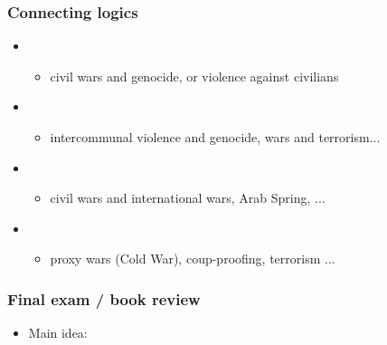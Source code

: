 \documentclass[aspectratio=43]{beamer}
\begin{document}
\begin{frame}
\frametitle{Connecting logics}
\centering

\begin{itemize}
  \item {}
  \begin{itemize}
    \item civil wars and genocide, or violence against civilians
  \end{itemize}
  \item<2-> 
  \begin{itemize}
    \item intercommunal violence and genocide, wars and terrorism...
  \end{itemize}
  \item<3-> 
  \begin{itemize}
    \item civil wars and international wars, Arab Spring, ...
  \end{itemize}
  \item<4-> 
  \begin{itemize}
    \item proxy wars (Cold War), coup-proofing, terrorism ...
  \end{itemize}
\end{itemize}

\end{frame}

\begin{frame}
\frametitle{Final exam / book review}
\centering

\begin{itemize}
  \item Main idea:
\end{itemize}

\end{frame}
\end{document}
